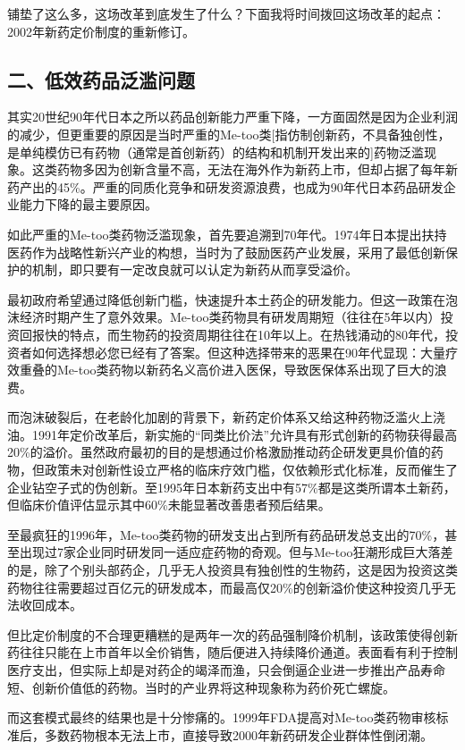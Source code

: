 铺垫了这么多，这场改革到底发生了什么？下面我将时间拨回这场改革的起点：2002年新药定价制度的重新修订。

\subsection{二、低效药品泛滥问题}

其实20世纪90年代日本之所以药品创新能力严重下降，一方面固然是因为企业利润的减少，但更重要的原因是当时严重的Me-too类[指仿制创新药，不具备独创性，是单纯模仿已有药物（通常是首创新药）的结构和机制开发出来的]药物泛滥现象。这类药物多因为创新含量不高，无法在海外作为新药上市，但却占据了每年新药产出的45\%。严重的同质化竞争和研发资源浪费，也成为90年代日本药品研发企业能力下降的最主要原因。

如此严重的Me-too类药物泛滥现象，首先要追溯到70年代。1974年日本提出扶持医药作为战略性新兴产业的构想，当时为了鼓励医药产业发展，采用了最低创新保护的机制，即只要有一定改良就可以认定为新药从而享受溢价。

最初政府希望通过降低创新门槛，快速提升本土药企的研发能力。但这一政策在泡沫经济时期产生了意外效果。Me-too类药物具有研发周期短（往往在5年以内）投资回报快的特点，而生物药的投资周期往往在10年以上。在热钱涌动的80年代，投资者如何选择想必您已经有了答案。但这种选择带来的恶果在90年代显现：大量疗效重叠的Me-too类药物以新药名义高价进入医保，导致医保体系出现了巨大的浪费。

而泡沫破裂后，在老龄化加剧的背景下，新药定价体系又给这种药物泛滥火上浇油。1991年定价改革后，新实施的“同类比价法”允许具有形式创新的药物获得最高20\%的溢价。虽然政府最初的目的是想通过价格激励推动药企研发更具价值的药物，但政策未对创新性设立严格的临床疗效门槛，仅依赖形式化标准，反而催生了企业钻空子式的伪创新。至1995年日本新药支出中有57\%都是这类所谓本土新药，但临床价值评估显示其中60\%未能显著改善患者预后结果。

至最疯狂的1996年，Me-too类药物的研发支出占到所有药品研发总支出的70\%，甚至出现过7家企业同时研发同一适应症药物的奇观。但与Me-too狂潮形成巨大落差的是，除了个别头部药企，几乎无人投资具有独创性的生物药，这是因为投资这类药物往往需要超过百亿元的研发成本，而最高仅20\%的创新溢价使这种投资几乎无法收回成本。

但比定价制度的不合理更糟糕的是两年一次的药品强制降价机制，该政策使得创新药往往只能在上市首年以全价销售，随后便进入持续降价通道。表面看有利于控制医疗支出，但实际上却是对药企的竭泽而渔，只会倒逼企业进一步推出产品寿命短、创新价值低的药物。当时的产业界将这种现象称为药价死亡螺旋。

而这套模式最终的结果也是十分惨痛的。1999年FDA提高对Me-too类药物审核标准后，多数药物根本无法上市，直接导致2000年新药研发企业群体性倒闭潮。

